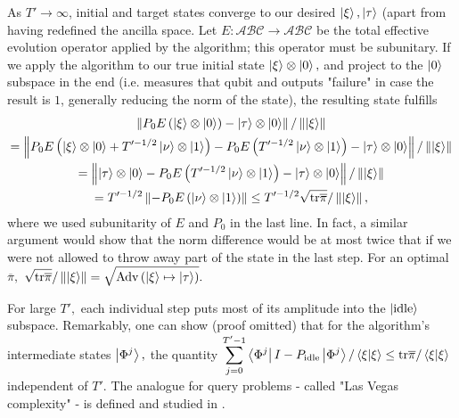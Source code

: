 \documentclass{article}
\begin{document}
 As $\displaystyle T'\rightarrow \infty $, initial and target states converge to our desired $\displaystyle \ket{\xi } ,\ket{\tau }$ (apart from having redefined the ancilla space. Let $E\colon\mathcal{ABC}\to\mathcal{ABC}$ be the total effective evolution operator applied by the algorithm; this operator must be subunitary. If we apply the algorithm to our true initial state $\displaystyle \ket{\xi } \otimes \ket{0} ,$ and project to the $\displaystyle \ket{0}$ subspace in the end (i.e. measures that qubit and outputs "failure" in case the result is $\displaystyle 1$, generally reducing the norm of the state), the resulting state fulfills
\begin{gather}
\left\Vert P_{0} E\left(\ket{\xi } \otimes \ket{0}\right) -\ket{\tau } \otimes \ket{0}\right\Vert /\left\Vert \ket{\xi }\right\Vert  \notag\\
=\left\Vert P_{0} E\left(\ket{\xi } \otimes \ket{0} +T^{\prime -1/2}\ket{\nu } \otimes \ket{1}\right) -P_{0} E\left( T^{\prime -1/2}\ket{\nu } \otimes \ket{1}\right) -\ket{\tau } \otimes \ket{0}\right\Vert /\left\Vert \ket{\xi }\right\Vert  \notag\\
=\left\Vert \ket{\tau } \otimes \ket{0} -P_{0} E\left( T^{\prime -1/2}\ket{\nu } \otimes \ket{1}\right) -\ket{\tau } \otimes \ket{0}\right\Vert /\left\Vert \ket{\xi }\right\Vert  \notag\\
=T^{\prime -1/2}\left\Vert -P_{0} E\left(\ket{\nu } \otimes \ket{1}\right)\right\Vert \leq T^{\prime -1/2}\sqrt{\mathrm{tr}\overline{\pi }} /\left\Vert \ket{\xi }\right\Vert ,
\end{gather}
where we used subunitarity of $E$ and $\displaystyle P_{0}$ in the last line. In fact, a similar argument would show that the norm difference would be at most twice that if we were not allowed to throw away part of the state in the last step. For an optimal $\displaystyle \overline{\pi } ,$ $\displaystyle \sqrt{\mathrm{tr}\overline{\pi }} /\left\Vert \ket{\xi }\right\Vert =\sqrt{\mathrm{Adv}\left(\ket{\xi } \mapsto \ket{\tau }\right)} .$



For large $\displaystyle T',$ each individual step puts most of its amplitude into the $\displaystyle \ket{\mathrm{idle}}$ subspace. Remarkably, one can show (proof omitted) that for the algorithm's intermediate states $\displaystyle \ket{\Phi ^{j}} ,$ the quantity $\displaystyle \sum _{j=0}^{T'-1}\bra{\Phi ^{j}} I-P_{\mathrm{idle}}\ket{\Phi ^{j}} /\bra{\xi }\ket{\xi } \leq \mathrm{tr\overline{\pi } /\bra{\xi }\ket{\xi }}$ independent of $\displaystyle T'.$ The analogue for query problems - called "Las Vegas complexity" - is defined and studied in \cite{LasVegas}.
\end{document}
